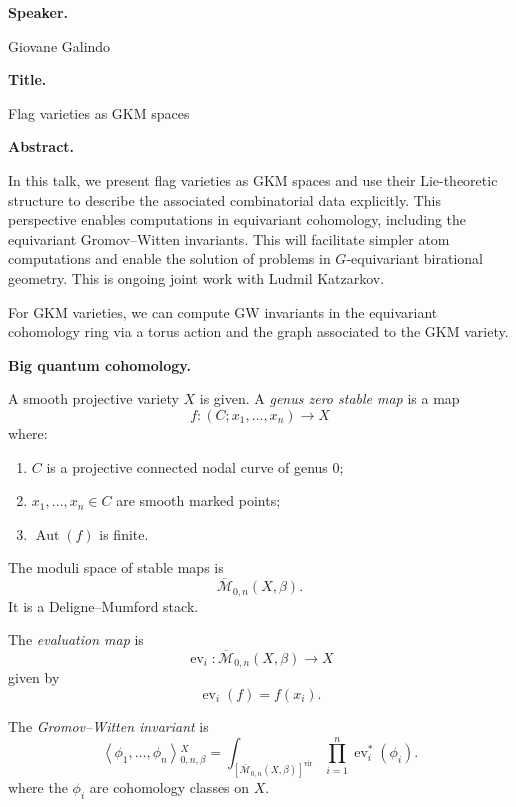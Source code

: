 \medskip\noindent
{\bf Speaker.}

Giovane Galindo

\medskip\noindent
{\bf Title.}

Flag varieties as GKM spaces

\medskip\noindent
{\bf Abstract.}

In this talk, we present flag varieties
as GKM spaces and use their Lie-theoretic
structure to describe the associated
combinatorial data explicitly.
This perspective enables computations in
equivariant cohomology, including the
equivariant Gromov--Witten invariants.
This will facilitate simpler atom
computations and enable the solution of
problems in $G$-equivariant birational
geometry.
This is ongoing joint work with
Ludmil Katzarkov.

\medskip\noindent
For GKM varieties, we can compute GW
invariants in the equivariant
cohomology ring via a torus action and
the graph associated to the GKM
variety.

\medskip\noindent
{\bf Big quantum cohomology.}

\begin{definition}
\label{definition-smooth-projective}
A smooth projective variety $X$ is
given.
A {\it genus zero stable map} is a map
\[
f:(C;x_1,\dots,x_n)\to X
\]
where:
\begin{enumerate}
\item $C$ is a projective connected
nodal curve of genus $0$;
\item $x_1,\dots,x_n\in C$ are smooth
marked points;
\item $\operatorname{Aut}(f)$
is finite.
\end{enumerate}
\end{definition}

The moduli space of stable maps is
\[
\overline{\mathcal M}_{0,n}(X,\beta).
\]
It is a Deligne--Mumford stack.

\begin{definition}
\label{definition-evaluation-map}
The {\it evaluation map} is
\[
\operatorname{ev}_i:
\overline{\mathcal M}_{0,n}(X,\beta)
\to X
\]
given by
\[
\operatorname{ev}_i(f)=f(x_i).
\]
\end{definition}

\begin{definition}
\label{definition-gromov-witten}
The {\it Gromov--Witten invariant} is
\[
\left\langle{}
\phi_1,\dots,\phi_n
\right\rangle{}^X_{0,n,\beta}
=
\int_{
[\overline{\mathcal M}_{0,n}(X,\beta)]^{
\mathrm{vir}}
}
\prod_{i=1}^n \operatorname{ev}_i^*(\phi_i).
\]
\noindent where the $\phi_i$ are
cohomology classes on $X$.
\end{definition}


